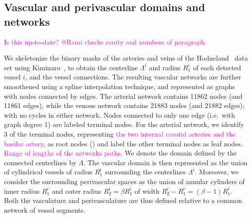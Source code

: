 \documentclass[fleqn,10pt]{wlscirep}
\newcommand{\mer}[1]{\textcolor{magenta}{#1}}
\begin{document}
\subsection*{Vascular and perivascular domains and networks}

\mer{Is this up-to-date? @Rami checks sanity and numbers of paragraph.}

We skeletonize the binary masks of the arteries and veins of the
Hodneland~\cite{hodneland2019new} data set using
Kiminaro~\cite{william_silversmith_2021_5539913}, to obtain the
centerline $\Lambda^i$ and radius $R_1^i$ of each detected vessel $i$,
and the vessel connections. The resulting vascular networks are
further smoothened using a spline interpolation technique, and
represented as graphs with nodes connected by edges. The arterial
network contains 11862 nodes (and 11861 edges), while the venous
network contains 21883 nodes (and 21882 edges); with no cycles in
either network. Nodes connected to only one edge (i.e.~with graph
degree 1) are labeled terminal nodes. For the arterial network, we
identify 3 of the terminal nodes, representing \mer{the two internal
  carotid arteries and the basilar artery}, as root nodes
() and label the other terminal nodes as leaf
nodes. \mer{Range of lengths of the networks paths.} We denote the
domain defined by the connected centerlines by $\Lambda$. The vascular
domain is then represented as the union of cylindrical vessels of
radius $R_1^i$ surrounding the centerlines $\Lambda^i$. Moreover, we
consider the surrounding perivascular spaces as the union of annular
cylinders of inner radius $R_1^i$ and outer radius $R_2^i = \beta R_1^i$ of width $R_2^i - R_1^i = (\beta - 1) R_1^i$. Both the vasculature and perivasculature are thus defined relative to a common network of vessel segments.
\end{document}
